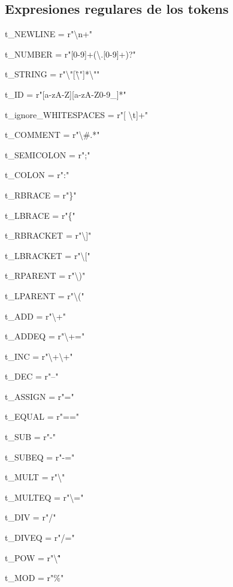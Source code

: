 \subsection{Expresiones regulares de los tokens}

t\_NEWLINE = r"\textbackslash n+"

t\_NUMBER = r"[0-9]+(\textbackslash.[0-9]+)?" 

t\_STRING = r"\textbackslash"[\^ \textbackslash"]*\textbackslash""

t\_ID = r"[a-zA-Z][a-zA-Z0-9\_]*"

t\_ignore\_WHITESPACES = r"[ \textbackslash t]+"

t\_COMMENT = r"\textbackslash\#.*"

t\_SEMICOLON = r";"

t\_COLON = r":"
 
t\_RBRACE = r"\}"
 
t\_LBRACE = r"\{"

t\_RBRACKET = r"\textbackslash]"
      
t\_LBRACKET = r"\textbackslash["
           
t\_RPARENT = r"\textbackslash)"
             
t\_LPARENT = r"\textbackslash("
              
t\_ADD = r"\textbackslash+"
                
t\_ADDEQ = r"\textbackslash+="
                   
t\_INC = r"\textbackslash+\textbackslash+"
                    
t\_DEC = r"--"
                     
t\_ASSIGN = r"="
                        
t\_EQUAL = r"=="
                          
t\_SUB = r"-"
                           
t\_SUBEQ = r"-="
                               
t\_MULT = r"\textbackslash*"
                                 
t\_MULTEQ = r"\textbackslash*="
                                   
t\_DIV = r"/"
                                     
t\_DIVEQ = r"/="
                                       
t\_POW = r"\textbackslash \^"
                                         
t\_MOD = r"\%"
                                           
